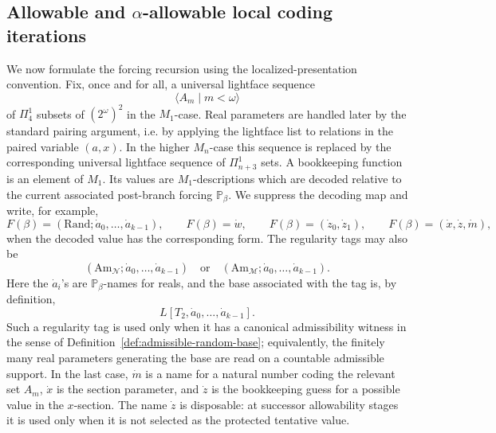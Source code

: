 \documentclass[a4paper,11pt]{article}
\begin{document}
\subsection{Allowable and \(\alpha\)-allowable local coding iterations}
\label{subsec:allowable-local-coding-iterations}

We now formulate the forcing recursion using the localized-presentation
convention.  Fix, once and for all, a universal lightface sequence
\[
   \langle A_m\mid m<\omega\rangle
\]
of \(\Pi^1_4\) subsets of \((2^\omega)^2\) in the \(M_1\)-case.  Real parameters are handled later by the standard pairing argument, i.e. by applying the lightface list to relations in the paired variable \((a,x)\).  In
the higher \(M_n\)-case this sequence is replaced by the corresponding
universal lightface sequence of \(\Pi^1_{n+3}\) sets.  A bookkeeping function
is an element of \(M_1\).  Its values are \(M_1\)-descriptions which are decoded
relative to the current associated post-branch forcing \(\mathbb P_\beta\).
We suppress the decoding map and write, for example,
\[
   F(\beta)=(\mathrm{Rand};\dot a_0,\ldots,\dot a_{k-1}),
   \qquad
   F(\beta)=\dot w,
   \qquad
   F(\beta)=(\dot z_0,\dot z_1),
   \qquad
   F(\beta)=(\dot x,\dot z,\dot m),
\]
when the decoded value has the corresponding form.  The regularity tags may
also be
\[
   (\mathrm{Am}_{\mathcal N};\dot a_0,\ldots,\dot a_{k-1})
   \quad\text{or}\quad
   (\mathrm{Am}_{\mathcal M};\dot a_0,\ldots,\dot a_{k-1}).
\]
Here the \(\dot a_i\)'s are \(\mathbb P_\beta\)-names for reals, and the base
associated with the tag is, by definition,
\[
   L[T_2,\dot a_0,\ldots,\dot a_{k-1}].
\]
Such a regularity tag is used only when it has a canonical admissibility witness
in the sense of Definition~\ref{def:admissible-random-base}; equivalently, the
finitely many real parameters generating the base are read on a countable
admissible support.  In the last case, \(\dot m\) is a name for a natural number
coding the relevant set \(A_m\), \(\dot x\) is the section parameter, and
\(\dot z\) is the bookkeeping guess for a possible value in the \(x\)-section.
The name \(\dot z\) is disposable: at successor allowability stages it is used
only when it is not selected as the protected tentative value.
\end{document}
